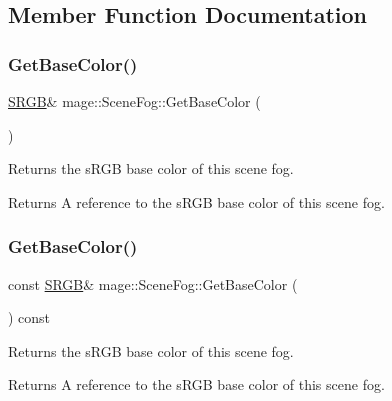 \subsection{Member Function Documentation}
\hypertarget{classmage_1_1_scene_fog_af0b0493cac23f9bc0cf86e0f28be824c}{}\label{classmage_1_1_scene_fog_af0b0493cac23f9bc0cf86e0f28be824c} 
\subsubsection{\texorpdfstring{Get\+Base\+Color()}{GetBaseColor()}\hspace{0.1cm}{\footnotesize\ttfamily [1/2]}}
{\footnotesize\ttfamily \hyperlink{structmage_1_1_s_r_g_b}{S\+R\+GB}\& mage\+::\+Scene\+Fog\+::\+Get\+Base\+Color (\begin{DoxyParamCaption}{ }\end{DoxyParamCaption})\hspace{0.3cm}{\ttfamily [noexcept]}}

Returns the s\+R\+GB base color of this scene fog.

\begin{DoxyReturn}{Returns}
A reference to the s\+R\+GB base color of this scene fog. 
\end{DoxyReturn}
\hypertarget{classmage_1_1_scene_fog_a43bb2d85e5c09a410598fe811e786d0f}{}\label{classmage_1_1_scene_fog_a43bb2d85e5c09a410598fe811e786d0f} 
\subsubsection{\texorpdfstring{Get\+Base\+Color()}{GetBaseColor()}\hspace{0.1cm}{\footnotesize\ttfamily [2/2]}}
{\footnotesize\ttfamily const \hyperlink{structmage_1_1_s_r_g_b}{S\+R\+GB}\& mage\+::\+Scene\+Fog\+::\+Get\+Base\+Color (\begin{DoxyParamCaption}{ }\end{DoxyParamCaption}) const\hspace{0.3cm}{\ttfamily [noexcept]}}

Returns the s\+R\+GB base color of this scene fog.

\begin{DoxyReturn}{Returns}
A reference to the s\+R\+GB base color of this scene fog. 
\end{DoxyReturn}
\hypertarget{classmage_1_1_scene_fog_adb3156f178ef56223329e73abb134e1c}{}\label{classmage_1_1_scene_fog_adb3156f178ef56223329e73abb134e1c} 
